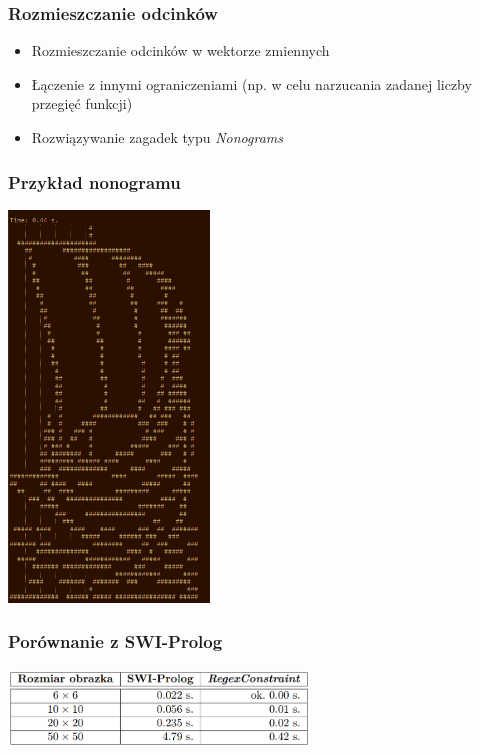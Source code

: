 \documentclass{beamer}
\begin{document}
    \begin{frame}
    	\frametitle{Rozmieszczanie odcinków}
        \begin{itemize}
            \item Rozmieszczanie odcinków w wektorze zmiennych
            \item Łączenie z innymi ograniczeniami (np. w celu narzucania zadanej liczby przegięć funkcji)
            \item Rozwiązywanie zagadek typu \textit{Nonograms}
        \end{itemize}
    \end{frame}

    \begin{frame}
        \frametitle{Przykład nonogramu}
        \begin{center}
            \includegraphics[width=0.4\textwidth]{drakkar.png}
        \end{center}
    \end{frame}
    \begin{frame}
        \frametitle{Porównanie z SWI-Prolog}
        \begin{center}
            \includegraphics[width=0.6\textwidth]{time_results.png}
        \end{center}
    \end{frame}
\end{document}
